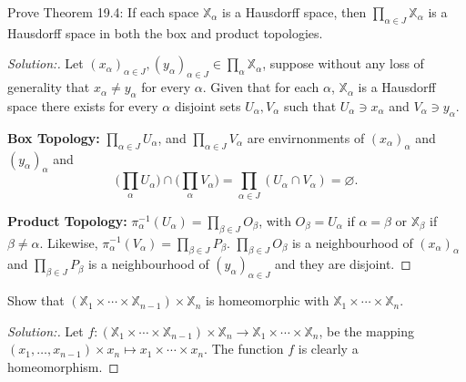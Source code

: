 \documentclass[a4paper,12pt, reqno]{article}
\theoremstyle{definition}
\newenvironment{exerr}[1]{
  \renewcommand\theexeralt{#1}
  \exeralt
}{\endexeralt}
\newenvironment{solution}{\begin{proof}[Solution:]}{\end{proof}}
\newcommand{\X}{\mathbb{X}}
\begin{document}
\begin{exerr}{3}
  Prove Theorem 19.4: If each space $\X_{\alpha}$ is a Hausdorff space, then $\prod_{\alpha\in J}\X_{\alpha}$ is a Hausdorff space in both the box and product topologies.
\end{exerr}
\begin{solution}
  Let $(x_{\alpha})_{\alpha\in J}, (y_{\alpha})_{\alpha\in J}\in\prod_{\alpha}\X_{\alpha}$, suppose without any loss of generality that $x_{\alpha}\neq y_{\alpha}$ for every $\alpha$. Given that for each $\alpha$, $\X_{\alpha}$ is a Hausdorff space there exists for every $\alpha$ disjoint sets $U_{\alpha}, V_{\alpha}$ such that $U_{\alpha}\ni x_{\alpha}$ and $V_{\alpha}\ni y_{\alpha}$.

  \noindent\textbf{Box Topology:} $\prod_{\alpha\in J}U_{\alpha}$, and $\prod_{\alpha\in J} V_{\alpha}$ are envirnonments of $(x_{\alpha})_{\alpha}$ and $(y_{\alpha})_{\alpha}$ and
  \begin{equation*}
    \Big( \prod_{\alpha}U_{\alpha} \Big)\cap \Big( \prod_{\alpha}V_{\alpha} \Big) = \prod_{\alpha\in J} (U_{\alpha}\cap V_{\alpha}) = \varnothing.
  \end{equation*}

  \noindent\textbf{Product Topology:} $\pi_{\alpha}^{-1}(U_{\alpha}) = \prod_{\beta\in J}O_{\beta}$, with $O_{\beta} = U_{\alpha}$ if $\alpha = \beta$ or $\X_{\beta}$ if $\beta\neq \alpha$. Likewise, $\pi_{\alpha}^{-1}(V_{\alpha}) = \prod_{\beta\in J}P_{\beta}$.
  $\prod_{\beta\in J}O_{\beta}$ is a neighbourhood of $(x_{\alpha})_{\alpha}$ and $\prod_{\beta\in J}P_{\beta}$ is a neighbourhood of $(y_{\alpha})_{\alpha\in J}$ and they are disjoint.
\end{solution}

\begin{exerr}{4}
  Show that $(\X_{1}\times\cdots\times\X_{n-1})\times \X_{n}$ is homeomorphic with $\X_{1}\times\cdots\times\X_{n}$.
\end{exerr}
\begin{solution}
  Let $f: (\X_{1}\times\cdots\times\X_{n-1})\times \X_{n}\to \X_{1}\times\cdots\times\X_{n}$, be the mapping $(x_{1},\dots,x_{n-1})\times x_{n}\mapsto x_{1}\times\cdots \times x_{n}$.
  The function $f$ is clearly a homeomorphism.
\end{solution}
\end{document}
